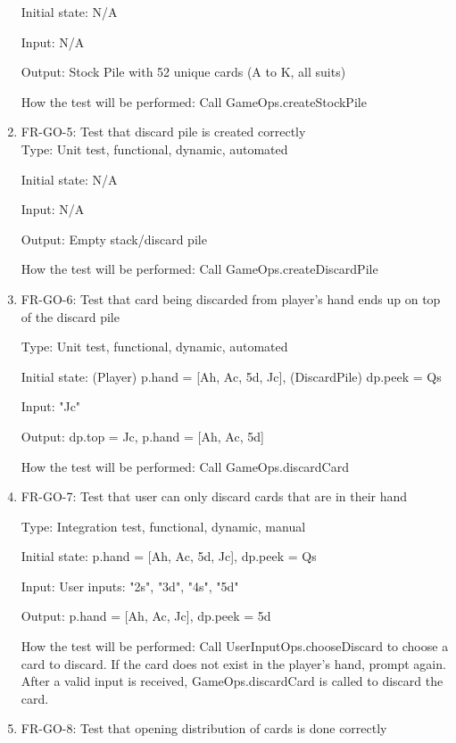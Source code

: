 \documentclass[12pt, titlepage]{article}
\begin{document}
\begin{enumerate}
    Initial state: N/A
    
    Input: N/A
    
    Output: Stock Pile with 52 unique cards (A to K, all suits)
    
    How the test will be performed: Call GameOps.createStockPile
    
    \item{FR-GO-5: Test that discard pile is created correctly\\}
    Type: Unit test, functional, dynamic, automated
    
    Initial state: N/A
    
    Input: N/A
    
    Output: Empty stack/discard pile
    
    How the test will be performed: Call GameOps.createDiscardPile
    
    \item{FR-GO-6: Test that card being discarded from player's hand ends up on top of the discard pile\\}
    
    Type: Unit test, functional, dynamic, automated
    
    Initial state: (Player) p.hand = [Ah, Ac, 5d, Jc], (DiscardPile) dp.peek = Qs
    
    Input: "Jc"
    
    Output: dp.top = Jc, p.hand = [Ah, Ac, 5d]
    
    How the test will be performed: Call GameOps.discardCard
    
    \item{FR-GO-7: Test that user can only discard cards that are in their hand\\}
    
    Type: Integration test, functional, dynamic, manual
    
    Initial state: p.hand = [Ah, Ac, 5d, Jc], dp.peek = Qs
    
    Input: User inputs: "2s", "3d", "4s", "5d"
    
    Output: p.hand = [Ah, Ac, Jc], dp.peek = 5d
    
    How the test will be performed: Call UserInputOps.chooseDiscard to choose a card to discard. If the card does not exist in the player's hand, prompt again. After a valid input is received, GameOps.discardCard is called to discard the card.
    
    \item{FR-GO-8: Test that opening distribution of cards is done correctly\\}
    

\end{enumerate}
\end{document}

